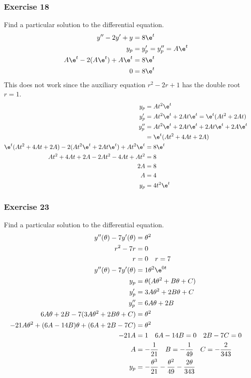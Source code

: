 \documentclass{math}
\begin{document}
\subsubsection*{Exercise 18}
Find a particular solution to the differential equation.
\begin{align*}
  y''-2y'+y &= 8\e^t \\
  y_p &= y_p' = y_p'' = A\e^t \\
  A\e^t-2(A\e^t)+A\e^t &= 8\e^t \\
  0 &= 8\e^t
\end{align*}
This does not work since the auxiliary equation \( r^2-2r+1 \) has the double
root \( r = 1 \).
\begin{align*}
  y_p &= At^2\e^t \\
  y_p' &= At^2\e^t+2At\e^t = \e^t(At^2+2At)\\
  y_p'' &= At^2\e^t+2At\e^t+2At\e^t+2A\e^t \\
  &= \e^t(At^2+4At+2A) \\
  \e^t(At^2+4At+2A)-2(At^2\e^t+2At\e^t)+At^2\e^t &= 8\e^t \\
  At^2+4At+2A-2At^2-4At+At^2 &= 8\\
  2A &= 8 \\
  A &= 4 \\
  y_p &= 4t^2\e^t
\end{align*}

\subsubsection*{Exercise 23}
Find a particular solution to the differential equation.
\begin{align*}
  y''(\theta)-7y'(\theta) &= \theta^2 \\
  r^2-7r &= 0 \\
  r &= 0 \quad r = 7 \\
  y''(\theta)-7y'(\theta) &= 1\theta^2\e^{0t} \\
  y_p &= \theta(A\theta^2+B\theta+C) \\
  y_p' &= 3A\theta^2+2B\theta+C \\
  y_p'' &= 6A\theta+2B \\
  6A\theta+2B-7(3A\theta^2+2B\theta+C) &= \theta^2 \\
  -21A\theta^2+(6A-14B)\theta+(6A+2B-7C) &= \theta^2 \\
  -21A &= 1 \quad 6A-14B = 0 \quad 2B-7C = 0 \\
  A &= -\frac{1}{21} \quad B = -\frac{1}{49} \quad C = -\frac{2}{343} \\
  y_p &= -\frac{\theta^3}{21}-\frac{\theta^2}{49}-\frac{2\theta}{343}
\end{align*}
\end{document}
